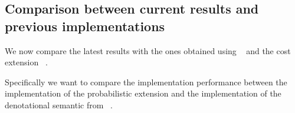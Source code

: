 
\subsection{Comparison between current results and previous implementations}
\label{sec:stat:impl:comp}

We now compare the latest results with the ones obtained using \fodaPA~\cite{acl13}
and the cost extension \fodaPAc~\cite{clc16}.

Specifically we want to compare the implementation performance
between the implementation of the
probabilistic extension and the implementation of the
denotational semantic from \fodaPA~\cite{acl13}.

